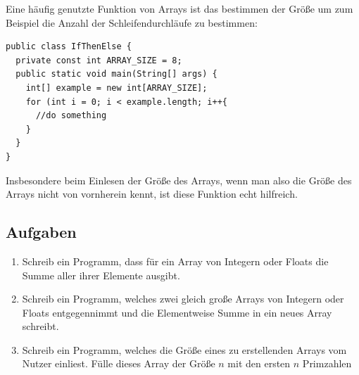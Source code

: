 Eine häufig genutzte Funktion von Arrays ist das bestimmen der Größe um zum Beispiel die Anzahl der Schleifendurchläufe zu bestimmen:

\begin{minipage}{\textwidth}
\begin{lstlisting}
public class IfThenElse {
  private const int ARRAY_SIZE = 8;
  public static void main(String[] args) {
    int[] example = new int[ARRAY_SIZE];
    for (int i = 0; i < example.length; i++{
      //do something
    }
  }
}
\end{lstlisting}	
\end{minipage}

Insbesondere beim Einlesen der Größe des Arrays, wenn man also die Größe des Arrays nicht von vornherein kennt, ist diese Funktion echt hilfreich.

\subsection{Aufgaben}

\begin{enumerate}
	\item Schreib ein Programm, dass für ein Array von Integern oder Floats die Summe aller ihrer Elemente ausgibt.
	\item Schreib ein Programm, welches zwei gleich große Arrays von Integern oder Floats entgegennimmt und die Elementweise Summe in ein neues Array schreibt.
	\item Schreib ein Programm, welches die Größe eines zu erstellenden Arrays vom Nutzer einliest. Fülle dieses Array der Größe $n$ mit den ersten $n$ Primzahlen
\end{enumerate}

